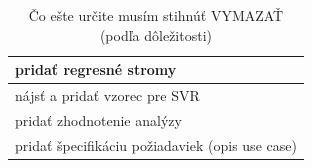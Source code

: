 \documentclass[a4paper,slovak,12pt,appendix]{article}
\begin{document}
\begin{table}[H]
  \caption{Čo ešte určite musím stihnúť VYMAZAŤ (podľa dôležitosti)}
  \centering
  \begin{tabular}{|p{}|}
    \hline
    pridať regresné stromy          \\ \hline
    nájsť a pridať vzorec pre SVR   \\ \hline
    pridať zhodnotenie analýzy      \\ \hline
    pridať špecifikáciu požiadaviek (opis use case)   \\ \hline
  \end{tabular}
\end{table}



\newpage
{}


\end{document}
